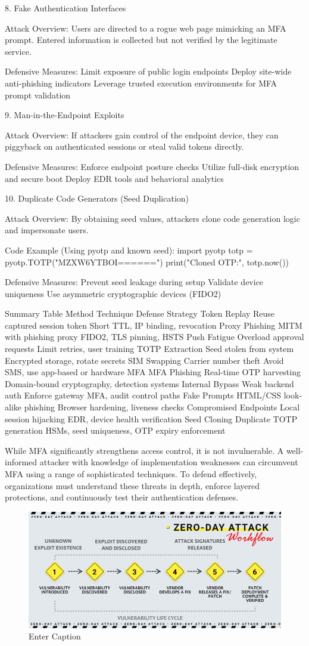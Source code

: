 8. Fake Authentication Interfaces

Attack Overview:
Users are directed to a rogue web page mimicking an MFA prompt. Entered information is collected but not verified by the legitimate service.

Defensive Measures:
Limit exposure of public login endpoints
Deploy site-wide anti-phishing indicators
Leverage trusted execution environments for MFA prompt validation


9. Man-in-the-Endpoint Exploits

Attack Overview:
If attackers gain control of the endpoint device, they can piggyback on authenticated sessions or steal valid tokens directly.

Defensive Measures:
Enforce endpoint posture checks
Utilize full-disk encryption and secure boot
Deploy EDR tools and behavioral analytics


10. Duplicate Code Generators (Seed Duplication)

Attack Overview:
By obtaining seed values, attackers clone code generation logic and impersonate users.

Code Example (Using pyotp and known seed):
import pyotp
totp = pyotp.TOTP("MZXW6YTBOI======")
print("Cloned OTP:", totp.now())

Defensive Measures:
Prevent seed leakage during setup
Validate device uniqueness
Use asymmetric cryptographic devices (FIDO2)



Summary Table
Method
Technique
Defense Strategy
Token Replay
Reuse captured session token
Short TTL, IP binding, revocation
Proxy Phishing
MITM with phishing proxy
FIDO2, TLS pinning, HSTS
Push Fatigue
Overload approval requests
Limit retries, user training
TOTP Extraction
Seed stolen from system
Encrypted storage, rotate secrets
SIM Swapping
Carrier number theft
Avoid SMS, use app-based or hardware MFA
MFA Phishing
Real-time OTP harvesting
Domain-bound cryptography, detection systems
Internal Bypass
Weak backend auth
Enforce gateway MFA, audit control paths
Fake Prompts
HTML/CSS look-alike phishing
Browser hardening, liveness checks
Compromised Endpoints
Local session hijacking
EDR, device health verification
Seed Cloning
Duplicate TOTP generation
HSMs, seed uniqueness, OTP expiry enforcement

While MFA significantly strengthens access control, it is not invulnerable. A well-informed attacker with knowledge of implementation weaknesses can circumvent MFA using a range of sophisticated techniques. To defend effectively, organizations must understand these threats in depth, enforce layered protections, and continuously test their authentication defenses.

\begin{figure}[htbp]
    \centering
    \includegraphics[width=\linewidth]{image.png}
    \caption{Enter Caption}
    \label{fig:placeholder}
\end{figure}

